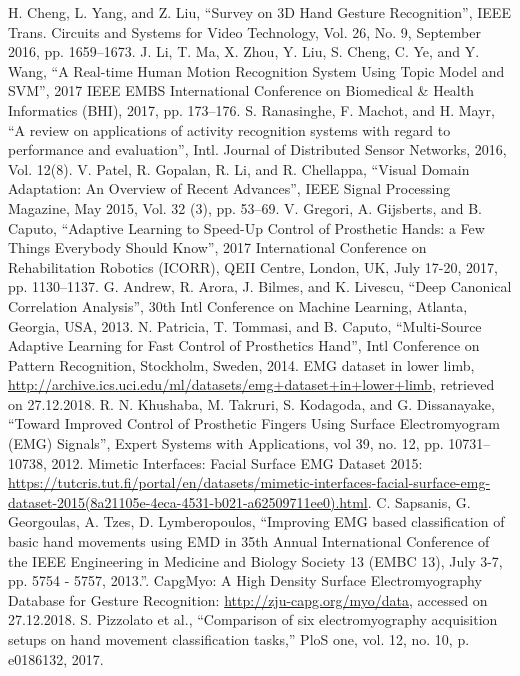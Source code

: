 \documentclass[conference]{IEEEtran}
\begin{document}
\begin{thebibliography}{00}
 H. Cheng, L. Yang, and Z. Liu, ``Survey on 3D Hand Gesture Recognition'', IEEE Trans. Circuits and Systems for Video Technology, Vol. 26, No. 9, September 2016, pp. 1659--1673.
 J. Li, T. Ma, X. Zhou, Y. Liu, S. Cheng, C. Ye, and Y. Wang, ``A Real-time Human Motion Recognition System Using Topic Model and SVM'', 2017 IEEE EMBS International Conference on Biomedical \& Health Informatics (BHI), 2017, pp. 173--176.
 S. Ranasinghe, F. Machot, and H. Mayr, ``A review on applications of activity recognition systems with regard to performance and evaluation'', Intl. Journal of Distributed Sensor Networks, 2016, Vol. 12(8).
 V. Patel, R. Gopalan, R. Li, and R. Chellappa, ``Visual Domain Adaptation: An Overview of Recent Advances'', IEEE Signal Processing Magazine, May 2015, Vol. 32 (3), pp. 53--69.
 V. Gregori, A. Gijsberts, and B. Caputo, ``Adaptive Learning to Speed-Up Control of Prosthetic Hands: a Few Things Everybody Should Know'', 2017 International Conference on Rehabilitation Robotics (ICORR), QEII Centre, London, UK, July 17-20, 2017, pp. 1130--1137.
 G. Andrew, R. Arora, J. Bilmes, and K. Livescu, ``Deep Canonical Correlation Analysis'', 30th Intl Conference on Machine Learning, Atlanta, Georgia, USA, 2013.
 N. Patricia, T. Tommasi, and B. Caputo, ``Multi-Source Adaptive Learning for Fast Control of Prosthetics Hand'',  Intl Conference on Pattern Recognition, Stockholm, Sweden, 2014.
 EMG dataset in lower limb, \url{http://archive.ics.uci.edu/ml/datasets/emg+dataset+in+lower+limb}, retrieved on 27.12.2018.
 R. N. Khushaba, M. Takruri, S. Kodagoda, and G. Dissanayake, ``Toward Improved Control of Prosthetic Fingers Using Surface Electromyogram (EMG) Signals'', Expert Systems with Applications, vol 39, no. 12, pp. 10731–10738, 2012.
 Mimetic Interfaces: Facial Surface EMG Dataset 2015: \url{https://tutcris.tut.fi/portal/en/datasets/mimetic-interfaces-facial-surface-emg-dataset-2015(8a21105e-4eca-4531-b021-a62509711ee0).html}.
 C. Sapsanis, G. Georgoulas, A. Tzes, D. Lymberopoulos, ``Improving EMG based classification of basic hand movements using EMD in 35th Annual International Conference of the IEEE Engineering in Medicine and Biology Society 13 (EMBC 13), July 3-7, pp. 5754 - 5757, 2013.''.
 CapgMyo: A High Density Surface Electromyography Database for Gesture Recognition: \url{http://zju-capg.org/myo/data}, accessed on 27.12.2018.
 S. Pizzolato et al., ``Comparison of six electromyography acquisition setups on hand movement classification tasks,'' PloS one, vol. 12, no. 10, p. e0186132, 2017.

\end{thebibliography}
\end{document}
